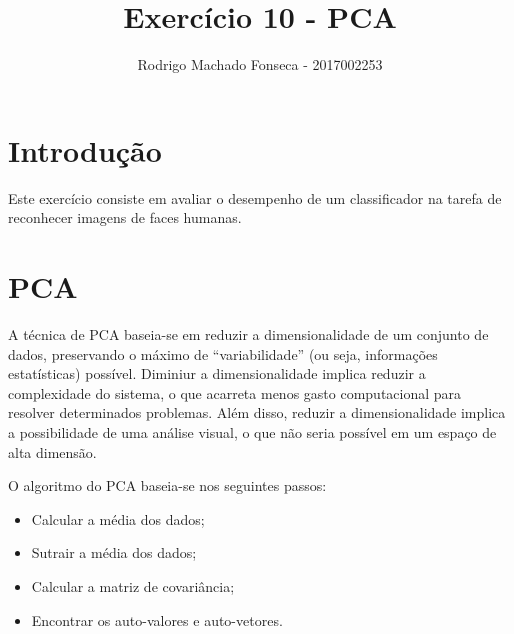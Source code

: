 \documentclass[12pt]{article}
\begin{document}

\pagestyle{fancy}
\fancyhf{}
\renewcommand{\headrulewidth}{0.4pt}
\fancyfoot[C]{\thepage}
\renewcommand{\footrulewidth}{0.4pt}
\fancyfoot[C]{\thepage}
\title{\LARGE \bf
 Exercício 10 - PCA }
\author{ Rodrigo Machado Fonseca - 2017002253}
\thispagestyle{fancy}
\maketitle
\thispagestyle{fancy}

\section{Introdução}

  \par Este exercício consiste em avaliar o desempenho de um classificador na tarefa de reconhecer imagens de faces humanas.
  
\section{PCA}
  
  \par A técnica de PCA baseia-se em  reduzir a dimensionalidade de um conjunto de dados, preservando o máximo de “variabilidade” (ou seja, informações estatísticas) possível. Diminiur a dimensionalidade implica reduzir a complexidade do sistema, o que acarreta menos gasto computacional para resolver determinados problemas. Além disso, reduzir a dimensionalidade implica a possibilidade de uma análise visual, o que não seria possível em um espaço de alta dimensão. 
  
  \par O algoritmo do PCA baseia-se nos seguintes passos:
  
  \begin{itemize}
    \item Calcular a média dos dados;
    \item Sutrair a média dos dados; 
    \item Calcular a matriz de covariância;
    \item Encontrar os auto-valores e auto-vetores.
    
  \end{itemize}
  
\end{document}
